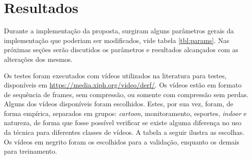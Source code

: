 \documentclass[cic,tc]{iiufrgs}
\begin{document}
\chapter{Resultados}
\label{sec:results}
Durante a implementação da proposta, surgiram alguns parâmetros gerais da implementação
que poderiam ser modificados, vide tabela \ref{tbl:params}. 
Nas próximas seções serão discutidos os parâmetros e resultados alcançados com as 
alterações dos mesmos.

Os testes foram executados com vídeos utilizados na literatura para testes,
disponíveis em \url{https://media.xiph.org/video/derf/}.
Os vídeos estão em formato de sequência de frames, sem compressão, ou somente com 
compressão sem perdas.
Alguns dos vídeos disponíveis foram escolhidos.
Estes, por sua vez, foram, de forma empírica, separados em grupos: \textit{cartoon}, 
monitoramento, esportes, \textit{indoor} e natureza, de forma que fosse possível 
verificar se existe alguma diferença no uso da técnica para diferentes classes de vídeos.
A tabela a seguir ilustra as escolhas.
Os vídeos em negrito foram os escolhidos para a validação, enquanto os demais para treinamento.
\end{document}
